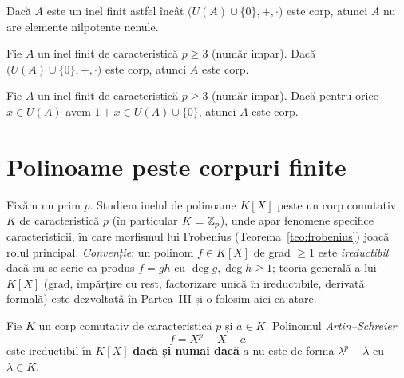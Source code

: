 \begin{propozitie}\label{prop:rp2}
Dacă $A$ este un inel finit astfel încât $\big(U(A)\cup\{0\},+,\cdot\big)$ este corp, atunci $A$ nu are elemente nilpotente nenule.
\end{propozitie}

\begin{propozitie}\label{prop:rp3}
Fie $A$ un inel finit de caracteristică $p\ge3$ (număr impar). Dacă $\big(U(A)\cup\{0\},+,\cdot\big)$ este corp, atunci $A$ este corp.
\end{propozitie}

\begin{propozitie}\label{prop:rp4}
Fie $A$ un inel finit de caracteristică $p\ge3$ (număr impar). Dacă pentru orice $x\in U(A)$ avem $1+x\in U(A)\cup\{0\}$, atunci $A$ este corp.
\end{propozitie}

\section{Polinoame peste corpuri finite}\label{sec:polcorpfinite}

Fixăm un prim $p$. Studiem inelul de polinoame $K[X]$ peste un corp comutativ $K$ de caracteristică $p$ (în particular $K=\mathbb{Z}_p$), unde apar fenomene specifice caracteristicii, în care morfismul lui Frobenius (Teorema~\ref{teo:frobenius}) joacă rolul principal. \emph{Convenție}: un polinom $f\in K[X]$ de grad $\ge1$ este \emph{ireductibil} dacă nu se scrie ca produs $f=gh$ cu $\deg g,\deg h\ge1$; teoria generală a lui $K[X]$ (grad, împărțire cu rest, factorizare unică în ireductibile, derivată formală) este dezvoltată în Partea~III și o folosim aici ca atare.

\begin{teorema}\label{teo:artinschreier}
Fie $K$ un corp comutativ de caracteristică $p$ și $a\in K$. Polinomul \emph{Artin--Schreier}
\[
f=X^p-X-a
\]
este ireductibil în $K[X]$ \textbf{dacă și numai dacă} $a$ nu este de forma $\lambda^p-\lambda$ cu $\lambda\in K$.
\end{teorema}

